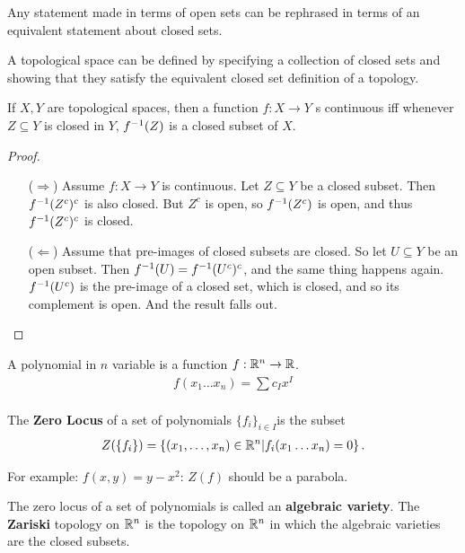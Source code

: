 \documentclass[12pt, twosided]{article}
\begin{document}
\begin{idea}
  Any statement made in terms of open sets can be rephrased in terms of an equivalent statement about closed sets.
\end{idea}
\begin{fact}
  A topological space can be defined by specifying a collection of closed sets and showing that they satisfy the equivalent closed set definition of a topology.
\end{fact}
\begin{prop}
  If \(X,Y\) are topological spaces, then a function \(f: X \to Y\) s continuous iff whenever \(Z \subseteq Y\) is closed in \(Y\), \(f^{-1}(Z)\) is a closed subset of \(X\).
\end{prop}
\begin{proof}
  \begin{enumerate}
  \item [(\(\Rightarrow\))] Assume \(f: X \to Y\) is continuous. Let \(Z \subseteq Y\)  be a closed subset. Then \(f^{-1}(Z^c)^c\) is also closed. But \(Z^c\) is open, so \(f^{-1}(Z^c)\) is open, and thus \(f^{-1}(Z^c)^c\) is closed.
  \item [(\(\Leftarrow\))] Assume that pre-images of closed subsets are closed. So let \(U \subseteq Y\) be an open subset. Then \(f^{-1}(U) = f^{-1}(U^c)^c\), and the same thing happens again. \(f^{-1}(U^c)\) is the pre-image of a closed set, which is closed, and so its complement is open. And the result falls out.
  \end{enumerate}
\end{proof}

\begin{df}
  A polynomial in \(n\) variable is a function \(f: \mathbb{R}^n \to \mathbb{R}\).
  \begin{align*}
    f(x_1 \ldots x_n) = \sum c_Ix^I \\
  \end{align*}

  The \textbf{Zero Locus} of a set of polynomials \(\{f_i\}_{i\in I}\)is the subset
  \begin{align*}
    Z(\{f_i\}) = \left\{ (x_1, \ldots, x_n) \in \mathbb{R}^n \middle\vert f_i(x_1 \ldots x_n) = 0 \right\}.
  \end{align*}
\end{df}

For example: \(f(x, y) = y - x^2\):
\(Z(f)\) should be a parabola.

\begin{df}
  The zero locus of a set of polynomials is called an \textbf{algebraic variety}. The \textbf{Zariski} topology on \(\mathbb{R}^n\) is the topology on \(\mathbb{R}^n\) in which the algebraic varieties are the closed subsets.
\end{df}
\end{document}
